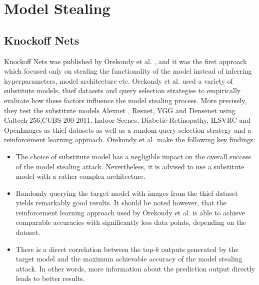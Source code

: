 \section{Model Stealing}
\label{sec:Related_work:Model_Stealing}

\subsection{Knockoff Nets}
\label{sec:Related_work:Model_Stealing:Knockoff_Nets}
Knockoff Nets was published by Orekondy et al. \cite{orekondy2019knockoff}, and it was the first approach which focused only on stealing the functionality
of the model instead of inferring hyperparameters, model architecture etc. Orekondy et al. used a variety of substitute models, thief datasets and query
selection strategies to empirically evaluate how these factors influence the model stealing process. More precisely, they test the substitute models
Alexnet \cite{krizhevsky2017imagenet}, Resnet, VGG and Densenet \cite{huang2017densely} using Caltech-256,CUBS-200-2011, Indoor-Scenes, Diabetic-Retinopathy,
ILSVRC and OpenImages as thief datasets as well as a random query selection strategy and a reinforcement learning approach. Orekondy et al. make the following
key findings: 
\begin{itemize}
    \item The choice of substitute model has a negligible impact on the overall success of the model stealing attack. Nevertheless, it is advised to use a
    substitute model with a rather complex architecture.
    \item Randomly querying the target model with images from the thief dataset yields remarkably good results. It should be noted however, that the reinforcement
    learning approach used by Orekondy et al. is able to achieve comparable accuracies with significantly less data points, depending on the dataset.
    \item There is a direct correlation between the top-$k$ outputs generated by the target model and the maximum achievable accuracy of the model stealing attack.
    In other words, more information about the prediction output directly leads to better results.
\end{itemize}

